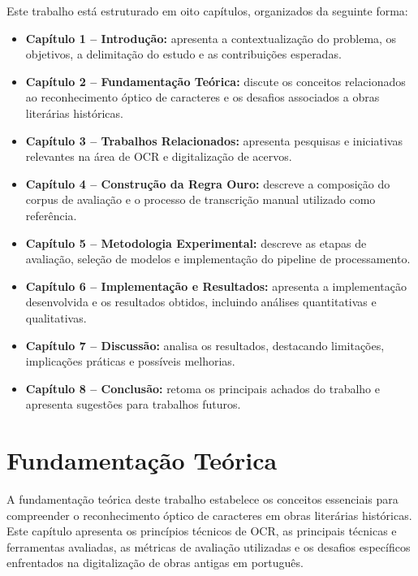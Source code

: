 \documentclass[
  12pt,
  oneside,
  a4paper,
  chapter=TITLE,
  section=TITLE,
  english,
  brazil
]{abntex2}
\begin{document}
Este trabalho está estruturado em oito capítulos, organizados da seguinte forma:

\begin{itemize}
    \item \textbf{Capítulo 1 -- Introdução:} apresenta a contextualização do problema,
    os objetivos, a delimitação do estudo e as contribuições esperadas.

    \item \textbf{Capítulo 2 -- Fundamentação Teórica:} discute os conceitos
    relacionados ao reconhecimento óptico de caracteres e os desafios associados a obras
    literárias históricas.

    \item \textbf{Capítulo 3 -- Trabalhos Relacionados:} apresenta pesquisas e
    iniciativas relevantes na área de OCR e digitalização de acervos.

    \item \textbf{Capítulo 4 -- Construção da Regra Ouro:} descreve a composição do
    corpus de avaliação e o processo de transcrição manual utilizado como referência.

    \item \textbf{Capítulo 5 -- Metodologia Experimental:} descreve as etapas de
    avaliação, seleção de modelos e implementação do pipeline de processamento.

    \item \textbf{Capítulo 6 -- Implementação e Resultados:} apresenta a implementação
    desenvolvida e os resultados obtidos, incluindo análises quantitativas e qualitativas.

    \item \textbf{Capítulo 7 -- Discussão:} analisa os resultados, destacando
    limitações, implicações práticas e possíveis melhorias.

    \item \textbf{Capítulo 8 -- Conclusão:} retoma os principais achados do trabalho e
    apresenta sugestões para trabalhos futuros.
\end{itemize}

\chapter{Fundamentação Teórica}

A fundamentação teórica deste trabalho estabelece os conceitos essenciais para
compreender o reconhecimento óptico de caracteres em obras literárias históricas. Este
capítulo apresenta os princípios técnicos de OCR, as principais técnicas e ferramentas
avaliadas, as métricas de avaliação utilizadas e os desafios específicos enfrentados na
digitalização de obras antigas em português.
\end{document}
